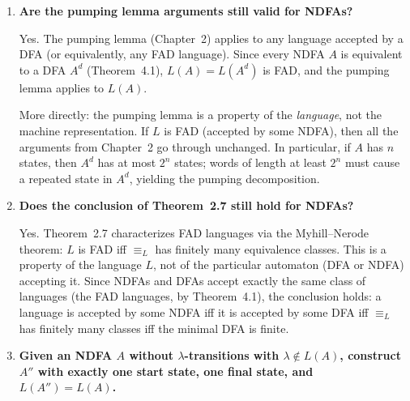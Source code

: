 \begin{enumerate}[{4.}1.]
\begin{enumerate}[(a)]
  \item \emph{DFA (connected portion only).}  Apply the subset construction.
  Because $L^r$ is the reverse of $L$ (which is FAD), $L^r$ is also FAD by
  Theorem~5.9 (closure under reversal).  The minimal DFA for $L^r$ can be
  computed from the subset construction applied to the reversed NDFA.
\end{enumerate}

\item \textbf{Are the pumping lemma arguments still valid for NDFAs?}

Yes.  The pumping lemma (Chapter~2) applies to any language accepted by a DFA
(or equivalently, any FAD language).  Since every NDFA $A$ is equivalent to a
DFA $A^d$ (Theorem~4.1), $L(A)=L(A^d)$ is FAD, and the pumping lemma applies
to $L(A)$.

More directly: the pumping lemma is a property of the \emph{language}, not the
machine representation.  If $L$ is FAD (accepted by some NDFA), then all the
arguments from Chapter~2 go through unchanged.  In particular, if $A$ has $n$
states, then $A^d$ has at most $2^n$ states; words of length at least $2^n$
must cause a repeated state in $A^d$, yielding the pumping decomposition.

\item \textbf{Does the conclusion of Theorem~2.7 still hold for NDFAs?}

Yes.  Theorem~2.7 characterizes FAD languages via the Myhill--Nerode theorem:
$L$ is FAD iff $\equiv_L$ has finitely many equivalence classes.  This is a
property of the language $L$, not of the particular automaton (DFA or NDFA)
accepting it.  Since NDFAs and DFAs accept exactly the same class of languages
(the FAD languages, by Theorem~4.1), the conclusion holds: a language is
accepted by some NDFA iff it is accepted by some DFA iff $\equiv_L$ has
finitely many classes iff the minimal DFA is finite.

\item \textbf{Given an NDFA $A$ without $\lambda$-transitions with $\lambda\notin L(A)$,
construct $A''$ with exactly one start state, one final state, and $L(A'')=L(A)$.}


\end{enumerate}
